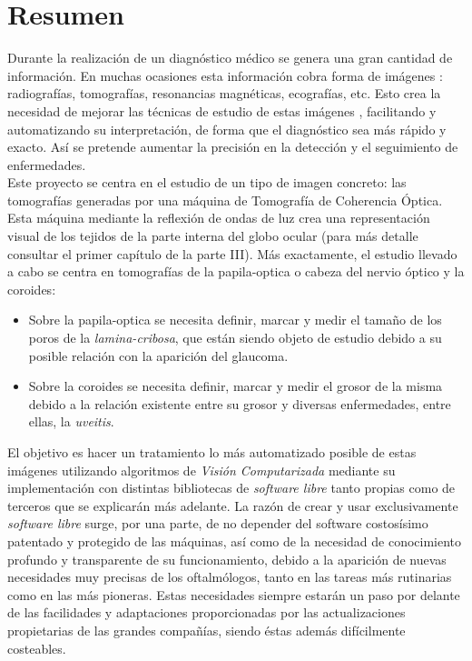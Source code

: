 \chapter*{Resumen}
Durante la realización de un diagnóstico médico se genera una gran
cantidad de información. En muchas ocasiones esta información cobra
forma de imágenes \emph{\citep*[1. The Analysis of Medical Images,
  2. Digital Image Acquisition]{toennies2012guide}}: radiografías,
tomografías, resonancias magnéticas, ecografías, etc. Esto crea la
necesidad de mejorar las técnicas de estudio de estas imágenes
\emph{\citep*[4. Image Enhancement]{toennies2012guide}}, facilitando y
automatizando su interpretación, de forma que el diagnóstico sea más
rápido y exacto. Así se pretende aumentar la precisión en la detección
y el seguimiento de enfermedades.\\
Este proyecto se centra en el estudio de un tipo de imagen concreto:
las tomografías generadas por una máquina de Tomografía de Coherencia
Óptica. Esta máquina mediante la reflexión de ondas de luz crea una
representación visual de los tejidos de la parte interna del globo
ocular (para más detalle consultar el primer capítulo de la parte
III). Más exactamente, el estudio llevado a cabo se centra en
tomografías de la \gls{papila-optica} o cabeza del nervio óptico y la
\gls{coroides}:
\begin{itemize}
\item Sobre la \gls{papila-optica} se necesita definir, marcar y medir
  el tamaño de los poros de la \emph{\gls{lamina-cribosa}}, que están
  siendo objeto de estudio debido a su posible relación con la
  aparición del \gls{glaucoma}.
\item Sobre la \gls{coroides} se necesita definir, marcar y medir el
  grosor de la misma debido a la relación existente entre su grosor y
  diversas enfermedades, entre ellas, la \emph{\gls{uveitis}}.
\end{itemize}
El objetivo es hacer un tratamiento lo más automatizado posible de
estas imágenes utilizando algoritmos de \emph{Visión Computarizada}
mediante su implementación con distintas bibliotecas de \emph{software
  libre} tanto propias como de terceros que se explicarán más
adelante. La razón de crear y usar exclusivamente \emph{software
  libre} surge, por una parte, de no depender del software costosísimo
patentado y protegido de las máquinas, así como de la necesidad de
conocimiento profundo y transparente de su funcionamiento, debido a la
aparición de nuevas necesidades muy precisas de los oftalmólogos,
tanto en las tareas más rutinarias como en las más pioneras. Estas
necesidades siempre estarán un paso por delante de las facilidades y
adaptaciones proporcionadas por las actualizaciones propietarias de
las grandes compañías, siendo éstas además difícilmente costeables.

